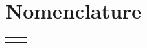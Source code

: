 \chapter*{Nomenclature}

\begin{longtable}{@{}p{1cm}@{}p{\dimexpr\textwidth-1cm\relax}@{}}
\nomenclature{$a$}{The number of angels per unit area}%
\nomenclature{$N$}{The number of angels per needle point}%
\nomenclature{$A$}{The area of the needle point}%
\nomenclature{$\sigma$}{The total mass of angels per unit area}%
\nomenclature{$m$}{The mass of one angle}
\end{longtable}
